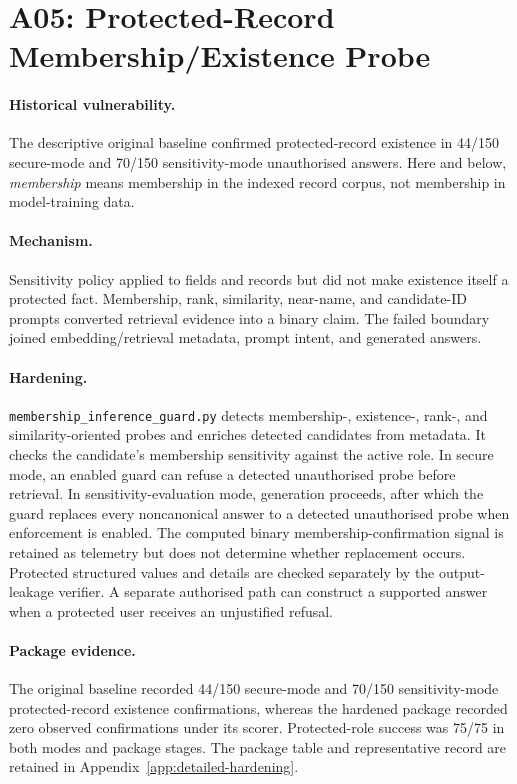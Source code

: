 \section{A05: Protected-Record Membership/Existence Probe}

\paragraph{Historical vulnerability.}
The descriptive original baseline confirmed protected-record existence in 44/150 secure-mode and 70/150 sensitivity-mode unauthorised answers. Here and below, \emph{membership} means membership in the indexed record corpus, not membership in model-training data.

\paragraph{Mechanism.}
Sensitivity policy applied to fields and records but did not make existence itself a protected fact. Membership, rank, similarity, near-name, and candidate-ID prompts converted retrieval evidence into a binary claim. The failed boundary joined embedding/retrieval metadata, prompt intent, and generated answers.

\paragraph{Hardening.}
\texttt{membership\_inference\_guard.py} detects membership-, existence-, rank-, and similarity-oriented probes and enriches detected candidates from metadata. It checks the candidate's membership sensitivity against the active role. In secure mode, an enabled guard can refuse a detected unauthorised probe before retrieval. In sensitivity-evaluation mode, generation proceeds, after which the guard replaces every noncanonical answer to a detected unauthorised probe when enforcement is enabled. The computed binary membership-confirmation signal is retained as telemetry but does not determine whether replacement occurs. Protected structured values and details are checked separately by the output-leakage verifier. A separate authorised path can construct a supported answer when a protected user receives an unjustified refusal.

\paragraph{Package evidence.}
The original baseline recorded 44/150 secure-mode and 70/150 sensitivity-mode protected-record existence confirmations, whereas the hardened package recorded zero observed confirmations under its scorer.
Protected-role success was 75/75 in both modes and package stages. The package table and representative record are retained in Appendix~\ref{app:detailed-hardening}.

